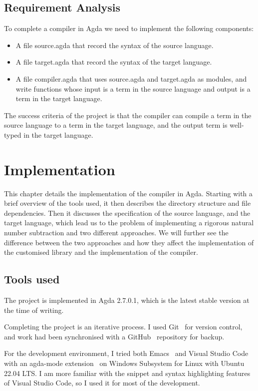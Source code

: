 \documentclass[12pt,twoside,a4paper]{report}
\theoremstyle{definition}
\theoremstyle{definition}
\theoremstyle{definition}
\theoremstyle{definition}
\begin{document}
    \section{Requirement Analysis}
    To complete a compiler in Agda we need to implement the following components:
    \begin{itemize}
        \item 
            A file source.agda that record the syntax of the source language.

        \item
            A file target.agda that record the syntax of the target language.

        \item
            A file compiler.agda that uses source.agda and target.agda as modules, and write functions whose input is a term in the source language and output is a term in the target language.
    \end{itemize}
    The success criteria of the project is that the compiler can compile a term in the source language to a term in the target language, and the output term is well-typed in the target language.

\chapter{Implementation} \label{chap: implementation}
    \minitoc
    This chapter details the implementation of the compiler in Agda. Starting with a brief overview of the tools used, it then describes the directory structure and file dependencies. Then it discusses the specification of the source language, and the target language, which lead us to the problem of implementing a rigorous natural number subtraction and two different approaches. We will further see the difference between the two approaches and how they affect the implementation of the customised library and the implementation of the compiler. 
    

    \section{Tools used}
    The project is implemented in Agda 2.7.0.1, which is the latest stable version at the time of writing.

    Completing the project is an iterative process. I used Git~\cite{git} for version control, and work had been synchronised with a GitHub~\cite{github} repository for backup.

    For the development environment, I tried both Emacs~\cite{emacs} and Visual Studio Code~\cite{vscode} with an agda-mode extension~\cite{agda_mode} on Windows Subsystem for Linux with Ubuntu~\cite{wsl_ubuntu} 22.04 LTS. I am more familiar with the snippet and syntax highlighting features of Visual Studio Code, so I used it for most of the development. 
\end{document}
